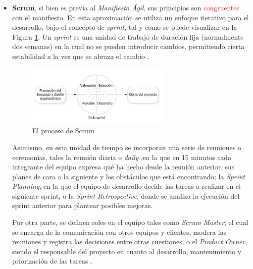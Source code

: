         \begin{itemize}
            \item \textbf{Scrum}, si bien es previa al \textit{Manifiesto Ágil}, sus principios son \textcolor{red}{congruentes} %
            con el manifiesto. En esta aproximación se utiliza un enfoque iterativo para el desarrollo, bajo el concepto de \textit{sprint}, tal y como se puede visualizar en la Figura \ref{fig:metodologia:scrum}. Un \textit{sprint} es una unidad de trabajo de duración fija (normalmente dos semanas) en la cual no se pueden introducir cambios, permitiendo cierta estabilidad a la vez que se abraza el cambio \cite{pressman_software_2005}. 
    
            \begin{figure}[h]
                \centering
                \includegraphics[width=0.66\textwidth]{figures/scrum.JPG}
                \caption[El proceso de Scrum, extraído de \cite{sommerville_software_2011}]{El proceso de Scrum}
                \label{fig:metodologia:scrum}
            \end{figure}
            
            Asimismo, en esta unidad de tiempo se incorporan una serie de reuniones o ceremonias, tales la reunión diaria o \textit{daily} ,en la que en 15 minutos cada integrante del equipo expresa qué ha hecho desde la reunión anterior, sus planes de cara a la siguiente y los obstáculos que está encontrando; la \textit{Sprint Planning}, en la que el equipo de desarrollo decide las tareas a realizar en el siguiente sprint, o la \textit{Sprint Retrospective}, donde se analiza la ejecución del sprint anterior para plantear posibles mejoras. 
    
            Por otra parte, se definen roles en el equipo tales como \textit{Scrum Master}, el cual se encarga de la comunicación con otros equipos y clientes, modera las reuniones y registra las decisiones entre otras cuestiones, o el \textit{Product Owner}, siendo el responsable del proyecto en cuanto al desarrollo, mantenimiento y priorización de las tareas \cite{valtx_metodologias_2023}.
    

\end{itemize}
